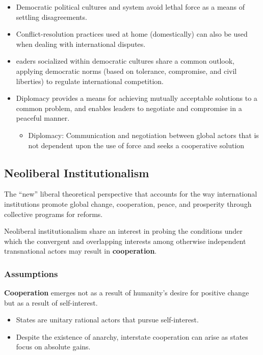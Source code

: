 \documentclass[
]{book}
\providecommand{\tightlist}{%
  \setlength{\itemsep}{0pt}\setlength{\parskip}{0pt}}
\begin{document}
\begin{itemize}
\item
  Democratic political cultures and system avoid lethal force as a means of settling disagreements.
\item
  Conflict-resolution practices used at home (domestically) can also be used when dealing with international disputes.
\item
  eaders socialized within democratic cultures share a common outlook, applying democratic norms (based on tolerance, compromise, and civil liberties) to regulate international competition.
\item
  Diplomacy provides a means for achieving mutually acceptable solutions to a common problem, and enables leaders to negotiate and compromise in a peaceful manner.

  \begin{itemize}
  \tightlist
  \item
    Diplomacy: Communication and negotiation between global actors that is not dependent upon the use of force and seeks a cooperative solution
  \end{itemize}
\end{itemize}

\hypertarget{neoliberal-institutionalism}{%
\subsection{Neoliberal Institutionalism}\label{neoliberal-institutionalism}}

The ``new'' liberal theoretical perspective that accounts for the way international institutions promote global change, cooperation, peace, and prosperity through collective programs for reforms.

Neoliberal institutionalism share an interest in probing the conditions under which the convergent and overlapping interests among otherwise independent transnational actors may result in \textbf{cooperation}.

\hypertarget{assumptions-2}{%
\subsubsection{Assumptions}\label{assumptions-2}}

\textbf{Cooperation} emerges not as a result of humanity's desire for positive change but as a result of self-interest.

\begin{itemize}
\item
  States are unitary rational actors that pursue self-interest.
\item
  Despite the existence of anarchy, interstate cooperation can arise as states focus on absolute gains.
\end{itemize}
\end{document}
